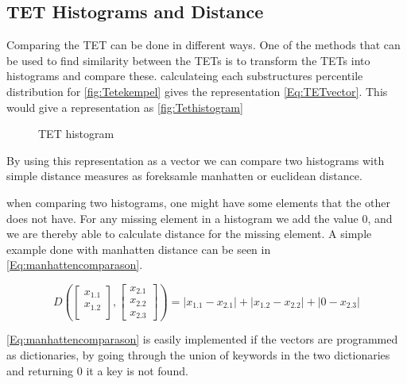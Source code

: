\subsection{TET Histograms and Distance}
	Comparing the TET can be done in different ways. One of the methods that can be used to find similarity between the TETs is to transform the TETs into histograms and compare these\cite{JAEGER201330}. calculateing each substructures percentile distribution for \autoref{fig:Tetekempel} gives the representation \autoref{Eq:TETvector}. This would give a representation as \autoref{fig:Tethistogram}
	
	\begin{figure}[H]
		\centering
		\begin{adjustbox}{width=0.5\textwidth}
			
		\end{adjustbox}
		\caption{TET histogram}
		\label{fig:Tethistogram}
	\end{figure}
	
	By using this representation as a vector we can compare two histograms with simple distance measures as foreksamle manhatten or euclidean distance.
	
	when comparing two histograms, one might have some elements that the other does not have. For any missing element in a histogram we add the value $0$, and we are thereby able to calculate distance for the missing element. A simple example done with manhatten distance can be seen in \autoref{Eq:manhattencomparason}\cite{singh2013k}.
	
	\begin{equation}\label{Eq:manhattencomparason}
	D(\begin{bmatrix}
	x_{1.1} \\
	x_{1.2} \\
	\end{bmatrix},
	\begin{bmatrix}
	x_{2.1} \\
	x_{2.2} \\
	x_{2.3}
	\end{bmatrix})= |x_{1.1} - x_{2.1}| + |x_{1.2} - x_{2.2}| + |0 - x_{2.3}|
	\end{equation}
	
	\autoref{Eq:manhattencomparason} is easily implemented if the vectors are programmed as dictionaries, by going through the union of keywords in the two dictionaries and returning 0 it a key is not found.
